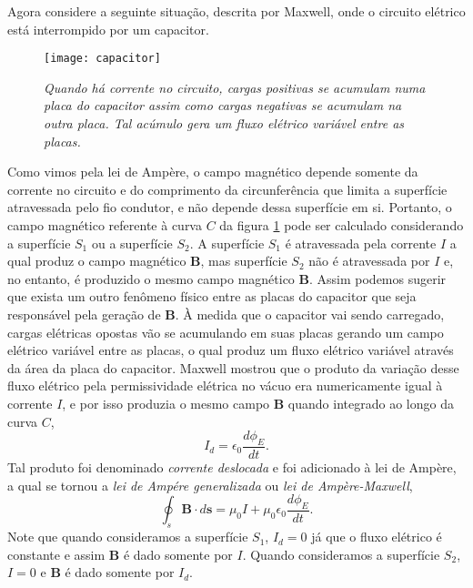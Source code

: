 Agora considere a seguinte situação, descrita por Maxwell, onde o circuito elétrico está interrompido por um capacitor. 
\begin{figure}
\centering
\texttt{[image: capacitor]}
\caption{\textit{Quando há corrente no circuito, cargas positivas se acumulam numa placa do capacitor assim como cargas negativas se acumulam na outra placa. Tal acúmulo gera um fluxo elétrico variável entre as placas.}}
\label{fig.capacitor}
\end{figure}
Como vimos pela lei de Ampère, o campo magnético depende somente da corrente no circuito e do comprimento da circunferência que limita a superfície atravessada pelo fio condutor, e não depende dessa superfície em si. Portanto, o campo magnético referente à curva $C$ da figura \ref{fig.capacitor} pode ser calculado considerando a superfície $S_1$ ou a superfície $S_2$. A superfície $S_1$ é atravessada pela corrente $I$ a qual produz o campo magnético $\mathbf{B}$, mas superfície $S_2$ não é atravessada por $I$ e, no entanto, é produzido o mesmo campo magnético $\mathbf{B}$. Assim podemos sugerir que exista um outro fenômeno físico entre as placas do capacitor que seja responsável pela geração de $\mathbf{B}$. À medida que o capacitor vai sendo carregado, cargas elétricas opostas vão se acumulando em suas placas gerando um campo elétrico variável entre as placas, o qual produz um fluxo elétrico variável através da área da placa do capacitor. Maxwell mostrou que o produto da variação desse fluxo elétrico pela permissividade elétrica no vácuo era numericamente igual à corrente $I$, e por isso produzia o mesmo campo $\mathbf{B}$ quando integrado ao longo da curva $C$,
\begin{equation*}
I_d=\epsilon_0\frac{d\phi_E}{dt}.
\end{equation*}
Tal produto foi denominado \textit{corrente deslocada} e foi adicionado à lei de Ampère, a qual se tornou a \textit{lei de Ampére generalizada} ou \textit{lei de Ampère-Maxwell},
\begin{equation}\label{eq.ampere_generalizada}
\oint_s\mathbf{B}\cdot d\mathbf{s}=\mu_0I+\mu_0\epsilon_0\frac{d\phi_E}{dt}.
\end{equation}
Note que quando consideramos a superfície $S_1$, $I_d=0$ já que o fluxo elétrico é constante e assim $\mathbf{B}$ é dado somente por $I$. Quando consideramos a superfície $S_2$, $I=0$ e $\mathbf{B}$ é dado somente por $I_d$. 





